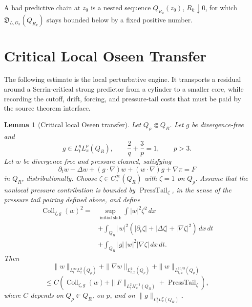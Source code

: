 \documentclass[11pt]{article}
\newtheorem{lemma}[theorem]{Lemma}
\begin{document}
A bad predictive chain at \(z_0\) is a nested sequence \(Q_{R_k}(z_0)\), \(R_k\downarrow0\), for which \(\mathfrak D_{L,\mathcal O_k}(Q_{R_k})\) stays bounded below by a fixed positive number.

\section{Critical Local Oseen Transfer}

The following estimate is the local perturbative engine.  It transports a
residual around a Serrin-critical strong predictor from a cylinder to a smaller
core, while recording the cutoff, drift, forcing, and pressure-tail costs that
must be paid by the source theorem interface.

\begin{lemma}[Critical local Oseen transfer]
Let \(Q_\rho\Subset Q_R\). Let \(g\) be divergence-free and
\[
g\in L^q_tL^p_x(Q_R),
\qquad
\frac2q+\frac3p=1,
\qquad
p>3.
\]
Let \(w\) be divergence-free and pressure-cleaned, satisfying
\[
\partial_t w-\Delta w
+(g\cdot\nabla)w
+(w\cdot\nabla)g
+\nabla \pi
=F
\]
in \(Q_R\), distributionally. Choose \(\zeta\in C_c^\infty(Q_R)\) with
\(\zeta=1\) on \(Q_\rho\). Assume that the nonlocal pressure contribution is
bounded by \(\operatorname{PressTail}_{\zeta}\), in the sense of the pressure
tail pairing defined above, and define
\[
\begin{aligned}
\operatorname{Coll}_{\zeta,g}(w)^2
=&
\sup_{\mathrm{initial\ slab}}\int |w|^2\zeta^2\,dx\\
&+
\int_{Q_R}|w|^2
\left(
|\partial_t\zeta|+|\Delta\zeta|+|\nabla\zeta|^2
\right)\,dx\,dt\\
&+
\int_{Q_R}|g|\,|w|^2|\nabla\zeta|\,dx\,dt.
\end{aligned}
\]
Then
\[
\|w\|_{L^\infty_tL^2_x(Q_\rho)}
+\|\nabla w\|_{L^2_{t,x}(Q_\rho)}
+\|w\|_{L^{10/3}_{t,x}(Q_\rho)}
\]
\[
\le
C
\left(
\operatorname{Coll}_{\zeta,g}(w)
+\|F\|_{L^2_tH^{-1}_x(Q_R)}
+\operatorname{PressTail}_{\zeta}
\right),
\]
where \(C\) depends on \(Q_\rho\Subset Q_R\), on \(p\), and on
\(\|g\|_{L^q_tL^p_x(Q_R)}\).
\end{lemma}
\end{document}
